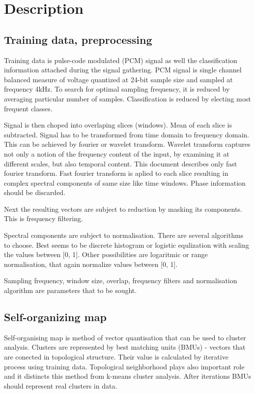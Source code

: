 \documentclass[a4paper]{IEEEtran}
\begin{document}
\section{Description}
\subsection{Training data, preprocessing}
Training data is pulse-code modulated (PCM) signal as well the classification 
information attached during the signal gathering.
PCM signal is single channel balanced measure of voltage
quantized at 24-bit sample size
and sampled at frequency 4kHz. To search for optimal sampling frequency,
it is reduced by averaging particular number of samples. Classification
is reduced by electing most frequent classes.

Signal is then choped into overlaping slices (windows).
Mean of each slice is subtracted.
Signal has to be transformed from time domain to frequency domain.
This can be achieved by fourier or wavelet transform.
Wavelet transform captures not only a notion of the frequency content of the input,
by examining it at different scales, but also temporal content.
This document describes only fast fourier transform.
Fast fourier transform is aplied to each slice resulting in
complex spectral components of same size like time windows.
Phase information should be discarded.

Next the resulting vectors are subject to reduction by masking its components.
This is frequency filtering.

Spectral components are subject to normalisation.
There are several algorithms to choose. Best seems to be 
discrete histogram or logistic equlization with scaling the values between [0, 1].
Other possibilities are logaritmic or range normalisation, that again normalize
values between [0, 1].

Sampling frequency, window size, overlap, frequency filters and normalisation algorithm 
are parameters that to be sought.

\subsection{Self-organizing map}
Self-organising map is method of vector quantisation that can be used to 
cluster analysis. Clusters are represented by best matching units (BMUs)
- vectors that are conected in topological structure. Their value is calculated
by iterative process using training data. Topological neighborhood plays 
also important role and it distincts this method from k-means cluster analysis.
After iterations BMUs should represent real clusters in data.
\end{document}
